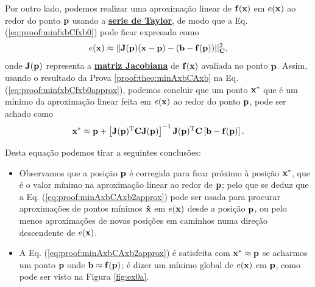 \begin{myproofT}
Por outro lado, podemos realizar uma aproximação linear de $\VECTOR{f}(\VECTOR{x})$ em $e(\VECTOR{x})$
ao redor do ponto $\VECTOR{p}$ usando a \hyperref[def:taylor]{\textbf{serie de Taylor}},
de modo que a Eq. (\ref{eq:proof:minfxbCfxb0}) pode ficar expresada como
\begin{equation}\label{eq:proof:minfxbCfxb0approx}
e(\VECTOR{x}) \approx ||\MATRIX{J}(\VECTOR{p})(\VECTOR{x}-\VECTOR{p})-(\VECTOR{b}-\VECTOR{f}(\VECTOR{p}))||_{\MATRIX{C}}^2,
\end{equation}
onde $\MATRIX{J}(\VECTOR{p})$ representa a \hyperref[def:jacobian]{\textbf{matriz Jacobiana}} 
de $\VECTOR{f}(\VECTOR{x})$ avaliada no ponto $\VECTOR{p}$.
Assim, usando o resultado da Prova \ref{proof:theo:minAxbCAxb} na Eq. (\ref{eq:proof:minfxbCfxb0approx}), 
podemos concluir que um ponto $\VECTOR{x}^*$ que é 
um mínimo da aproximação linear feita em $e(\VECTOR{x})$ ao redor do ponto $\VECTOR{p}$,
pode ser achado como
\begin{equation}\label{eq:proof:minAxbCAxb2approx}
\VECTOR{x}^* \approx \VECTOR{p}+ \left[ \MATRIX{J}(\VECTOR{p})^{\transpose}\MATRIX{C}\MATRIX{J}(\VECTOR{p}) \right]^{-1} \MATRIX{J}(\VECTOR{p})^{\transpose}\MATRIX{C} \left[\VECTOR{b}-\VECTOR{f}(\VECTOR{p})\right].
\end{equation}


Desta equação podemos tirar a seguintes conclusões:
\begin{itemize}

\item Observamos que a posição $\VECTOR{p}$ é corregida para ficar próximo à posição $\VECTOR{x}^*$, 
que é o valor mínimo na aproximação linear ao redor de $\VECTOR{p}$;
pelo que se deduz que a Eq. (\ref{eq:proof:minAxbCAxb2approx})
pode ser usada para procurar aproximações de pontos mínimos $\VECTOR{\hat{x}}$ em $e(\VECTOR{x})$ desde a posição $\VECTOR{p}$,
ou pelo menos aproximações de novas posições em caminhos numa direção descendente de $e(\VECTOR{x})$.

\item A Eq. (\ref{eq:proof:minAxbCAxb2approx}) é satisfeita 
com $\VECTOR{x}^* \approx \VECTOR{p}$ se acharmos um  
ponto $\VECTOR{p}$ onde  $\VECTOR{b} \approx \VECTOR{f}(\VECTOR{p})$; 
é dizer um mínimo global de $e(\VECTOR{x})$ em $\VECTOR{p}$, como pode ser visto na Figura \ref{fig:ex0a}. 


\end{itemize}
\end{myproofT}
